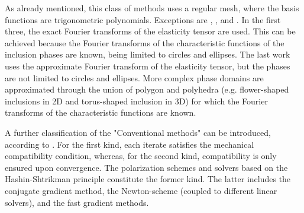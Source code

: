 As already mentioned, this class of methods uses a regular mesh, where the basis functions are trigonometric polynomials.
Exceptions are \cite{bonnet_effective_2007}, \cite{monchiet_polarization-based_2012}, \cite{monchiet_combining_2015} and \cite{nguyen_derivation_2021}.
In the first three, the exact Fourier transforms of the elasticity tensor are used.
This can be achieved because the Fourier transforms of the characteristic functions of the inclusion phases are known, being limited to circles and ellipses.
The last work uses the approximate Fourier transform of the elasticity tensor, but the phases are not limited to circles and ellipses.
More complex phase domains are approximated through the union of polygon and polyhedra (e.g. flower-shaped inclusions in 2D and torus-shaped inclusion in 3D) for which the Fourier transforms of the characteristic functions are known.


A further classification of the "Conventional methods" can be introduced, according to \cite{schneider_barzilai-borwein_2019}.
For the first kind, each iterate satisfies the mechanical compatibility condition, whereas, for the second kind, compatibility is only ensured upon convergence.
The polarization schemes and solvers based on the Hashin-Shtrikman principle constitute the former kind.
The latter includes the conjugate gradient method, the Newton-scheme (coupled to different linear solvers), and the fast gradient methods.

